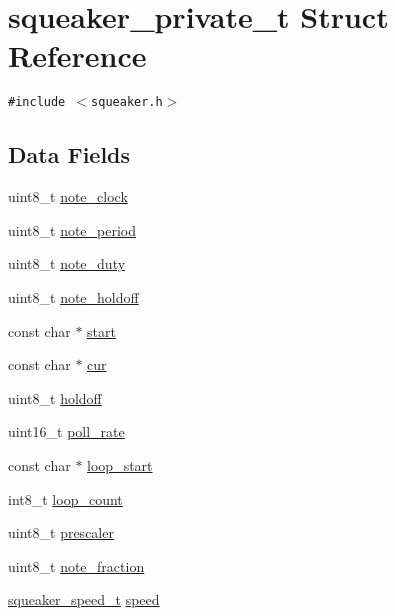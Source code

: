 \hypertarget{structsqueaker__private__t}{
\section{squeaker\_\-private\_\-t Struct Reference}
\label{structsqueaker__private__t}
}
{\tt \#include $<$squeaker.h$>$}

\subsection*{Data Fields}
\begin{CompactItemize}
\item 
uint8\_\-t \hyperlink{structsqueaker__private__t_372154b877a2a8d9faf23b335a27b181}{note\_\-clock}
\item 
uint8\_\-t \hyperlink{structsqueaker__private__t_c19828d0be7f4938c7676bf1547623c7}{note\_\-period}
\item 
uint8\_\-t \hyperlink{structsqueaker__private__t_af9ffc0b06a83522a648d1b429f8e435}{note\_\-duty}
\item 
uint8\_\-t \hyperlink{structsqueaker__private__t_5d8ae288cd1d6f1a51a1447510119317}{note\_\-holdoff}
\item 
const char $\ast$ \hyperlink{structsqueaker__private__t_6f45e1943e6f0b8ee67117abd6a6b62b}{start}
\item 
const char $\ast$ \hyperlink{structsqueaker__private__t_21a7eea0a8ccac207baefae4d81865f5}{cur}
\item 
uint8\_\-t \hyperlink{structsqueaker__private__t_69ca1b8a142c2a4ac543ede5b8beb06b}{holdoff}
\item 
uint16\_\-t \hyperlink{structsqueaker__private__t_4c251844d783d1683e0838c058488255}{poll\_\-rate}
\item 
const char $\ast$ \hyperlink{structsqueaker__private__t_ae7ca730e1ef15f14016aacbad39152a}{loop\_\-start}
\item 
int8\_\-t \hyperlink{structsqueaker__private__t_6a199edcabf647fed91b5d1fffc209d1}{loop\_\-count}
\item 
uint8\_\-t \hyperlink{structsqueaker__private__t_37d737c89bb007a89506a36eaa9dfec3}{prescaler}
\item 
uint8\_\-t \hyperlink{structsqueaker__private__t_315fb902ec138569cbb35195ae7c06a9}{note\_\-fraction}
\item 
\hyperlink{squeaker_8h_4cc7534d62566009c93b46ffc3c23b2a}{squeaker\_\-speed\_\-t} \hyperlink{structsqueaker__private__t_8cb834a7e4b7213d6510f8d341e4043e}{speed}

\end{CompactItemize}
